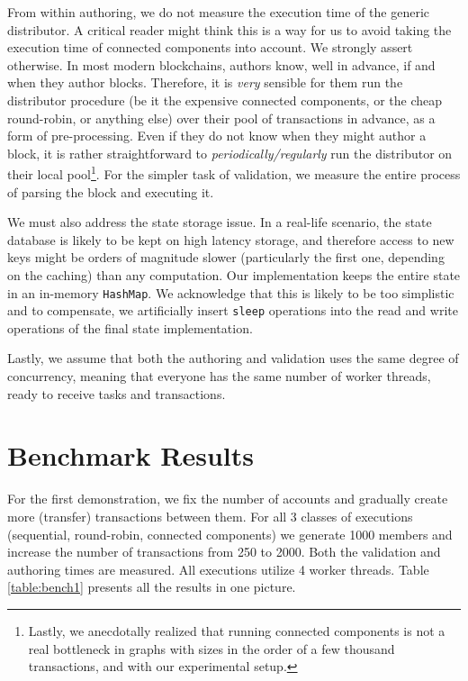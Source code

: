 From within authoring, we do not measure the execution time of the generic distributor. A critical
reader might think this is a way for us to avoid taking the execution time of connected components
into account. We strongly assert otherwise. In most modern blockchains, authors know, well in
advance, if and when they author blocks. Therefore, it is \textit{very} sensible for them run the
distributor procedure (be it the expensive connected components, or the cheap round-robin, or
anything else) over their pool of transactions in advance, as a form of pre-processing. Even if they
do not know when they might author a block, it is rather straightforward to
\textit{periodically/regularly} run the distributor on their local pool\footnote{Lastly, we
anecdotally realized that running connected components is not a real bottleneck in graphs with
sizes in the order of a few thousand transactions, and with our experimental setup.}. For the
simpler task of validation, we measure the entire process of parsing the block and executing it.

We must also address the state storage issue. In a real-life scenario, the state database is likely
to be kept on high latency storage, and therefore access to new keys might be orders of magnitude
slower (particularly the first one, depending on the caching) than any computation. Our
implementation keeps the entire state in an in-memory \texttt{HashMap}. We acknowledge that this is
likely to be too simplistic and to compensate, we artificially insert \texttt{sleep} operations into
the read and write operations of the final state implementation.

Lastly, we assume that both the authoring and validation uses the same degree of concurrency,
meaning that everyone has the same number of worker threads, ready to receive tasks and
transactions.

\section{Benchmark Results} \label{chap_b&a:sec:results}

For the first demonstration, we fix the number of accounts and gradually create more (transfer)
transactions between them. For all 3 classes of executions (sequential, round-robin, connected
components) we generate 1000 members and increase the number of transactions from 250 to 2000. Both
the validation and authoring times are measured. All executions utilize 4 worker threads. Table
\ref{table:bench1} presents all the results in one picture.

